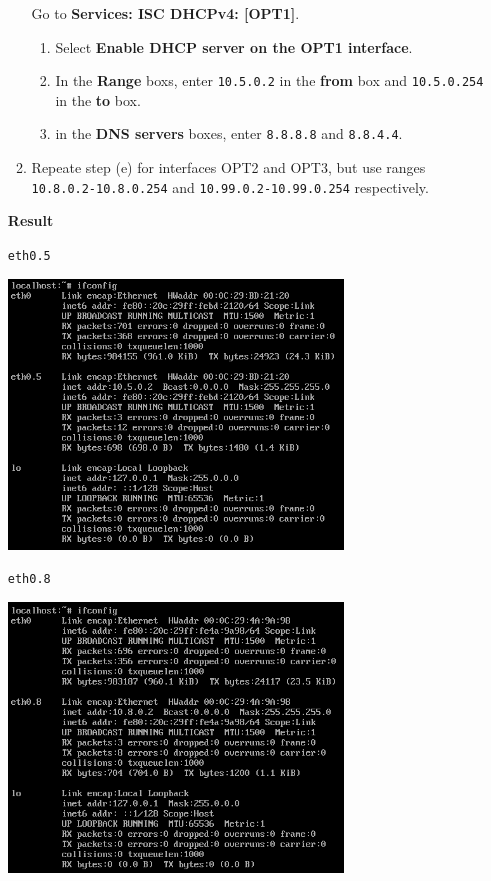 \documentclass[12pt, a4paper]{article}
\begin{document}
\begin{enumerate}[resume]
\begin{enumerate}
      Go to \textbf{Services: ISC DHCPv4: [OPT1]}.
      \begin{enumerate}
        \item Select \textbf{Enable DHCP server on the OPT1 interface}.
        \item In the \textbf{Range} boxs, enter \verb|10.5.0.2| in the \textbf{from} box and \verb|10.5.0.254| in the \textbf{to} box.
        \item in the \textbf{DNS servers} boxes, enter \verb|8.8.8.8| and \verb|8.8.4.4|.
      \end{enumerate}

      \item Repeate step (e) for interfaces OPT2 and OPT3, but use ranges
      \verb|10.8.0.2-10.8.0.254| and \verb|10.99.0.2-10.99.0.254| respectively.
    \end{enumerate}

    \pagebreak
    \textbf{Result}

    \verb|eth0.5|

    \includegraphics[width=0.7\textwidth]{5_eth0.5.png}

    \verb|eth0.8|

    \includegraphics[width=0.7\textwidth]{5_eth0.8.png}


\end{enumerate}
\end{document}
